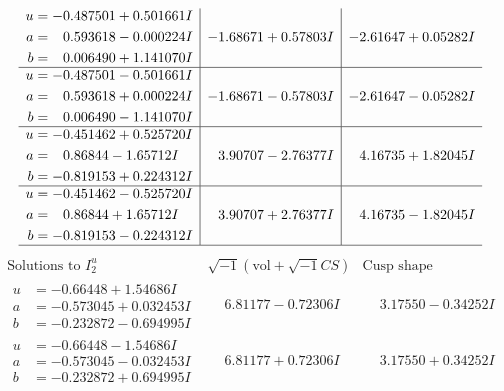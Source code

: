 \documentclass[1p]{elsarticle_modified}
\theoremstyle{definition}
\newcommand{\I}{\sqrt{-1}}
\begin{document}
$$\begin{array}{c|c|c}
\begin{aligned}
u &= -0.487501 + 0.501661 I \\
a &= \phantom{-}0.593618 - 0.000224 I \\
b &= \phantom{-}0.006490 + 1.141070 I\end{aligned}
 & -1.68671 + 0.57803 I & -2.61647 + 0.05282 I \\ \hline\begin{aligned}
u &= -0.487501 - 0.501661 I \\
a &= \phantom{-}0.593618 + 0.000224 I \\
b &= \phantom{-}0.006490 - 1.141070 I\end{aligned}
 & -1.68671 - 0.57803 I & -2.61647 - 0.05282 I \\ \hline\begin{aligned}
u &= -0.451462 + 0.525720 I \\
a &= \phantom{-}0.86844 - 1.65712 I \\
b &= -0.819153 + 0.224312 I\end{aligned}
 & \phantom{-}3.90707 - 2.76377 I & \phantom{-}4.16735 + 1.82045 I \\ \hline\begin{aligned}
u &= -0.451462 - 0.525720 I \\
a &= \phantom{-}0.86844 + 1.65712 I \\
b &= -0.819153 - 0.224312 I\end{aligned}
 & \phantom{-}3.90707 + 2.76377 I & \phantom{-}4.16735 - 1.82045 I\\
 \hline 
 \end{array}$$\newpage$$\begin{array}{c|c|c}  
\text{Solutions to }I^u_{2}& \I (\text{vol} + \sqrt{-1}CS) & \text{Cusp shape}\\
 \hline 
\begin{aligned}
u &= -0.66448 + 1.54686 I \\
a &= -0.573045 + 0.032453 I \\
b &= -0.232872 - 0.694995 I\end{aligned}
 & \phantom{-}6.81177 - 0.72306 I & \phantom{-}3.17550 - 0.34252 I \\ \hline\begin{aligned}
u &= -0.66448 - 1.54686 I \\
a &= -0.573045 - 0.032453 I \\
b &= -0.232872 + 0.694995 I\end{aligned}
 & \phantom{-}6.81177 + 0.72306 I & \phantom{-}3.17550 + 0.34252 I \\ \hline\begin{aligned}

\end{aligned}
\end{array}$$
\end{document}
